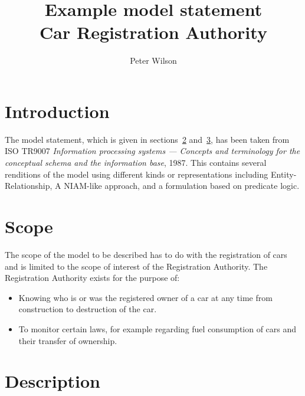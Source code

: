 \documentclass{article}
\title{Example model statement \\
       Car Registration Authority}
\author{Peter Wilson}
\date{}
\begin{document}
\maketitle
\tableofcontents
\clearpage


\section{Introduction}


   The model statement, which is given in sections~\ref{scope} 
and~\ref{description}, has been taken from ISO TR9007 \textit{Information
processing systems --- Concepts and terminology for the conceptual
schema and the information base}, 1987. This contains several renditions
of the model using different kinds or representations including
Entity-Relationship, A NIAM-like approach, and a formulation based on
predicate logic.


\section{Scope} \label{scope}

The scope of the model to be described has to do with the registration of cars
and is limited to the scope of interest of the Registration Authority. The
Registration Authority exists for the purpose of:

\begin{itemize}

\item Knowing who is or was the registered owner of a car at any time from
construction to destruction of the car.

\item To monitor certain laws, for example regarding fuel consumption of cars
and their transfer of ownership.

\end{itemize}

\section{Description} \label{description}
\end{document}
